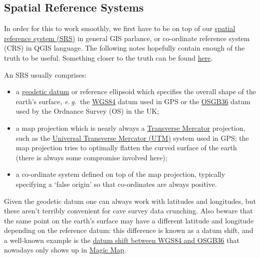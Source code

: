 \documentclass[]{article}
\newcommand{\latin}[1]{\emph{#1}}
\newcommand{\eg}{\latin{e.\,g.}}
\begin{document}
\subsection{Spatial Reference Systems}\label{spatial-reference-systems}

In order for this to work smoothly, we first have to be on top of our
\href{https://en.wikipedia.org/wiki/Spatial_reference_system}{spatial
reference system (SRS)} in general GIS parlance, or co-ordinate
reference system (CRS) in QGIS language. The following notes hopefully
contain enough of the truth to be useful. Something closer to the truth
can be found
\href{http://www.bnhs.co.uk/focuson/grabagridref/html/OSGB.pdf}{here}.

An SRS usually comprises:

\begin{itemize}
\item
  a \href{https://en.wikipedia.org/wiki/Geodetic_datum}{geodetic datum}
  or reference ellipsoid which specifies the overall shape of the
  earth's surface, \eg\ the
  \href{https://en.wikipedia.org/wiki/World_Geodetic_System}{WGS84}
  datum used in GPS or the
  \href{https://en.wikipedia.org/wiki/Ordnance_Survey_National_Grid}{OSGB36}
  datum used by the Ordnance Survey (OS) in the UK;
\item
  a map projection which is nearly always a
  \href{https://en.wikipedia.org/wiki/Transverse_Mercator_projection}{Transverse
  Mercator} projection, such as the
  \href{https://en.wikipedia.org/wiki/Universal_Transverse_Mercator_coordinate_system}{Universal
  Transverse Mercator (UTM)} system used in GPS; the map projection
  tries to optimally flatten the curved surface of the earth (there is
  always some compromise involved here);
\item
  a co-ordinate system defined on top of the map projection, typically
  specifying a `false origin' so that co-ordinates are always positive.
\end{itemize}

Given the geodetic datum one can always work with latitudes and
longitudes, but these aren't terribly convenient for cave survey data
crunching. Also beware that the same point on the earth's surface may
have a different latitude and longitude depending on the reference
datum: this difference is known as a datum shift, and a well-known
example is the
\href{https://en.wikipedia.org/wiki/Ordnance_Survey_National_Grid\#Datum_shift_between_OSGB_36_and_WGS_84}{datum
  shift between WGS84 and OSGB36} that nowadays only shows up in
\href{http://www.natureonthemap.naturalengland.org.uk/MagicMap.aspx}{Magic
  Map}.
\end{document}
